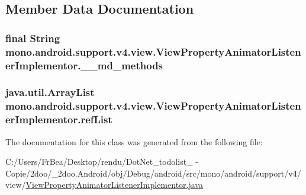 \subsection{Member Data Documentation}
\hypertarget{classmono_1_1android_1_1support_1_1v4_1_1view_1_1_view_property_animator_listener_implementor_b6738444d210e9579be376595ecb6c38}{
\subsubsection[{\_\-\_\-md\_\-methods}]{\setlength{\rightskip}{0pt plus 5cm}final String {\bf mono.android.support.v4.view.ViewPropertyAnimatorListenerImplementor.\_\-\_\-md\_\-methods}}}
\label{classmono_1_1android_1_1support_1_1v4_1_1view_1_1_view_property_animator_listener_implementor_b6738444d210e9579be376595ecb6c38}


\hypertarget{classmono_1_1android_1_1support_1_1v4_1_1view_1_1_view_property_animator_listener_implementor_e76bbdc89bdf55eecf733f6ae1922a25}{
\subsubsection[{refList}]{\setlength{\rightskip}{0pt plus 5cm}java.util.ArrayList {\bf mono.android.support.v4.view.ViewPropertyAnimatorListenerImplementor.refList}}}
\label{classmono_1_1android_1_1support_1_1v4_1_1view_1_1_view_property_animator_listener_implementor_e76bbdc89bdf55eecf733f6ae1922a25}




The documentation for this class was generated from the following file:\begin{CompactItemize}
\item 
C:/Users/FrBea/Desktop/rendu/DotNet\_\-todolist\_ - Copie/2doo/\_\-2doo.Android/obj/Debug/android/src/mono/android/support/v4/view/\hyperlink{_view_property_animator_listener_implementor_8java}{ViewPropertyAnimatorListenerImplementor.java}\end{CompactItemize}
